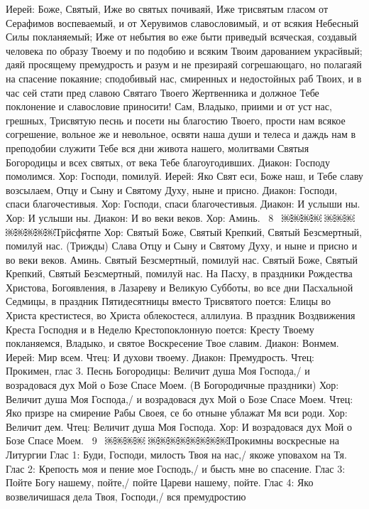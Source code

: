 Иерей: Боже, Святый, Иже во святых почиваяй, Иже трисвятым гласом от Серафимов воспеваемый, и от Херувимов славословимый, и от всякия Небесный Силы покланяемый; Иже от небытия во еже быти приведый всяческая, создавый человека по образу Твоему и по подобию и всяким Твоим дарованием украсйвый; даяй просящему премудрость и разум и не презираяй согрешающаго, но полагаяй на спасение покаяние; сподобивый нас, смиренных и недостойных раб Твоих, и в час сей стати пред славою Святаго Твоего Жертвенника и должное Тебе поклонение и славословие приносити! Сам, Владыко, приими и от уст нас, грешных, Трисвятую песнь и посети ны благостию Твоего, прости нам всякое согрешение, вольное же и невольное, освяти наша души и телеса и даждь нам в преподобии служити Тебе вся дни живота нашего, молитвами Святыя Богородицы и всех святых, от века Тебе благоугодивших.
Диакон: Господу помолимся.
Хор: Господи, помилуй.
Иерей: Яко Свят еси, Боже наш, и Тебе славу возсылаем, Отцу и Сыну и Святому Духу, ныне и присно.
Диакон: Господи, спаси благочестивыя.
Хор: Господи, спаси благочестивыя.
Диакон: И услыши ны.
Хор: И услыши ны.
Диакон: И во веки веков.
Хор: Аминь.
~8~
￼￼￼￼
￼￼￼￼￼￼￼￼Трйсфятпе
Хор: Святый Боже, Святый Крепкий, Святый Безсмертный, помилуй нас. (Трижды)
Слава Отцу и Сыну и Святому Духу, и ныне и присно и во веки веков. Аминь.
Святый Безсмертный, помилуй нас.
Святый Боже, Святый Крепкий, Святый Безсмертный, помилуй
нас.
На Пасху, в праздники Рождества Христова, Богоявления, в Лазареву и Великую Субботы, во все дни Пасхальной Седмицы, в праздник Пятидесятницы вместо Трисвятого поется:
Елицы во Христа крестистеся, во Христа облекостеся, аллилуиа.
В праздник Воздвижения Креста Господня и в Неделю Крестопоклонную поется:
Кресту Твоему покланяемся, Владыко, и святое Воскресение Твое славим.
Диакон: Вонмем.
Иерей: Мир всем.
Чтец: И духови твоему.
Диакон: Премудрость.
Чтец: Прокимен, глас 3. Песнь Богородицы: Величит душа Моя Господа,/ и возрадовася дух Мой о Бозе Спасе Моем. (В Богородичные праздники)
Хор: Величит душа Моя Господа,/ и возрадовася дух Мой о Бозе Спасе Моем.
Чтец: Яко призре на смирение Рабы Своея, се бо отныне ублажат Мя вси роди.
Хор: Величит дем.
Чтец: Величит душа Моя Господа.
Хор: И возрадовася дух Мой о Бозе Спасе Моем.
~9~
￼￼￼￼
￼￼￼￼￼￼￼￼Прокимны воскресные на Литургии Глас 1:
Буди, Господи, милость Твоя на нас,/ якоже уповахом на Тя. Глас 2:
Крепость моя и пение мое Господь,/ и бысть мне во спасение. Глас 3:
Пойте Богу нашему, пойте,/ пойте Цареви нашему, пойте. Глас 4:
Яко возвеличишася дела Твоя, Господи,/ вся премудростию
